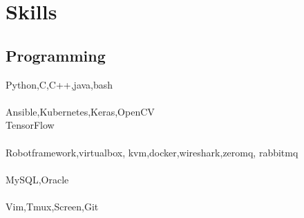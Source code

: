\documentclass[11pt]{hieudo-build}
\begin{document}
\begin{minipage}[t]{0.34\textwidth}
\section{Skills}                                                    \subsection{Programming}                                          
Python,C,C++,java,bash\\~\\
Ansible,Kubernetes,Keras,OpenCV\\                                           
TensorFlow\\~\\
Robotframework,virtualbox,
kvm,docker,wireshark,zeromq,
rabbitmq \\~\\
MySQL,Oracle \\~\\
Vim,Tmux,Screen,Git\\
 
 \sectionsep
{}
\sectionsep
\end{minipage} 
\hfill
\end{document}

